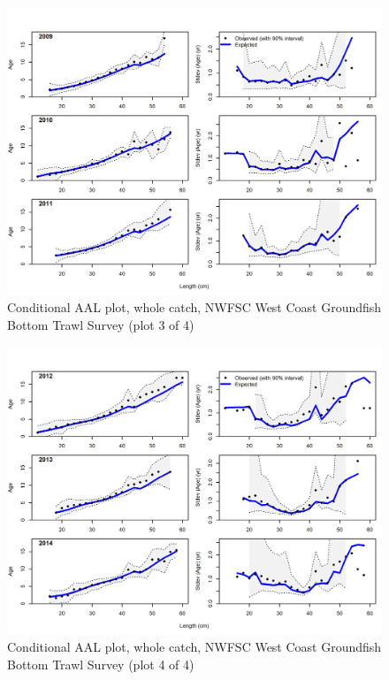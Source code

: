\documentclass[12pt,]{article}
\begin{document}
\begin{figure}
\centering
\includegraphics{r4ss/plots_mod1/comp_condAALfit_Andre_plotsflt7mkt0_page3.png}
\caption{Conditional AAL plot, whole catch, NWFSC West Coast Groundfish
Bottom Trawl Survey (plot 3 of 4) \label{fig:nwfsc_combo_andre_3}}
\end{figure}

\begin{figure}
\centering
\includegraphics{r4ss/plots_mod1/comp_condAALfit_Andre_plotsflt7mkt0_page4.png}
\caption{Conditional AAL plot, whole catch, NWFSC West Coast Groundfish
Bottom Trawl Survey (plot 4 of 4) \label{fig:nwfsc_combo_andre_4}}
\end{figure}
\end{document}
